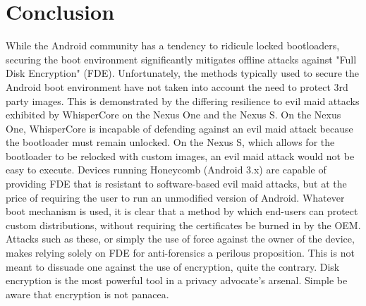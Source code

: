 \section{Conclusion}
While the Android community has a tendency to ridicule locked bootloaders, securing the boot environment significantly mitigates
offline attacks against "Full Disk Encryption" (FDE).  Unfortunately, the methods typically used to secure the Android boot
environment have not taken into account the need to protect 3rd party images.  This is demonstrated by the differing resilience to
evil maid attacks exhibited by WhisperCore on the Nexus One and the Nexus S.  On the Nexus One, WhisperCore is incapable of
defending against an evil maid attack because the bootloader must remain unlocked.  On the Nexus S, which allows for the bootloader
to be relocked with custom images, an evil maid attack would not be easy to execute.  Devices running Honeycomb (Android 3.x) are
capable of providing FDE that is resistant to software-based evil maid attacks, but at the price of requiring the user to run an
unmodified version of Android.  Whatever boot mechanism is used, it is clear that a method by which end-users can protect custom
distributions, without requiring the certificates be burned in by the OEM.  Attacks such as these, or simply the use of force
against the owner of the device, makes relying solely on FDE for anti-forensics a perilous proposition. This is not meant to
dissuade one against the use of encryption, quite the contrary. Disk encryption is the most powerful tool in a privacy advocate's
arsenal. Simple be aware that encryption is not panacea.
